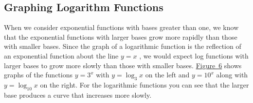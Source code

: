 \documentclass[10pt,]{book}
\theoremstyle{plain}
\theoremstyle{definition}
\theoremstyle{definition}
\theoremstyle{definition}
\numberwithin{equation}{section}
\begin{document}
\subsection[{Graphing Logarithm Functions}]{Graphing Logarithm Functions}\label{subsection-4}
\hypertarget{p-336}{}%
When we consider exponential functions with bases greater than one, we know that the exponential functions with larger bases grow more rapidly than those with smaller bases.  Since the graph of a logarithmic function is the reflection of an exponential function about the line \(y = x\) , we would expect log functions with larger bases to grow more slowly than those with smaller bases.  \hyperref[exp-log-base-3-10]{Figure~6} shows graphs of the functions \(y = 3^x\) with \(y = \log_3 x\) on the left and \(y = 10^x\) along with \(y = \log_{10} x \) on the right. For the logarithmic functions you can see that the larger base produces a curve that increases more slowly.%
\end{document}
